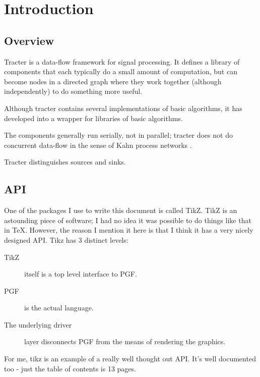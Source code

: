 \section{Introduction}
\subsection{Overview}

Tracter is a data-flow framework for signal processing.  It defines a
library of components that each typically do a small amount of
computation, but can become nodes in a directed graph where they work
together (although independently) to do something more useful.

Although tracter contains several implementations of basic algorithms,
it has developed into a wrapper for libraries of basic algorithms.

The components generally run serially, not in parallel; tracter does
not do concurrent data-flow in the sense of Kahn process networks
\citep{Lee1995}.

Tracter distinguishes sources and sinks.


\subsection{API}

One of the packages I use to write this document is called TikZ.  TikZ
is an astounding piece of software; I had no idea it was possible to
do things like that in \TeX.  However, the reason I mention it here is
that I think it has a very nicely designed API.  Tikz has 3 distinct
levels:
\begin{description}
\item[TikZ] itself is a top level interface to PGF.
\item[PGF] is the actual language.
\item[The underlying driver] layer disconnects PGF from the means of
  rendering the graphics.
\end{description}
For me, tikz is an example of a really well thought out API.  It's
well documented too - just the table of contents is 13 pages.

